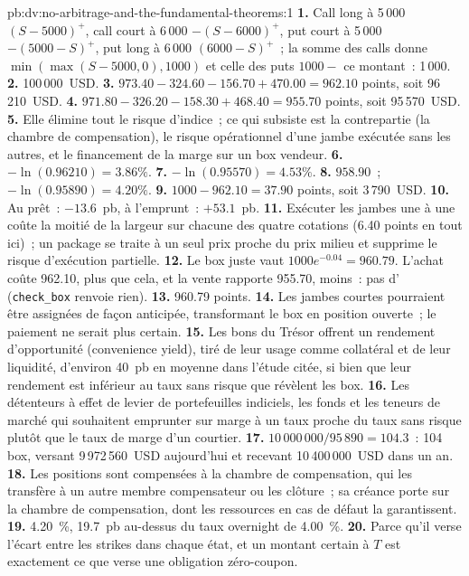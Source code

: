 \begin{solution}{pb:dv:no-arbitrage-and-the-fundamental-theorems:1}
\textbf{1.} Call long à 5\,000 $(S-5000)^+$, call court à 6\,000 $-(S-6000)^+$, put court
à 5\,000 $-(5000-S)^+$, put long à 6\,000 $(6000-S)^+$~; la somme des calls donne
$\min(\max(S-5000,0),1000)$ et celle des puts $1000-$ ce montant~: 1\,000.
\textbf{2.} 100\,000~USD.
\textbf{3.} $973.40-324.60-156.70+470.00=962.10$ points, soit 96\,210~USD.
\textbf{4.} $971.80-326.20-158.30+468.40=955.70$ points, soit 95\,570~USD.
\textbf{5.} Elle élimine tout le risque d'indice~; ce qui subsiste est la contrepartie (la
chambre de compensation), le risque opérationnel d'une jambe exécutée sans les autres, et
le financement de la marge sur un box vendeur.
\textbf{6.} $-\ln(0.96210)=3.86\%$.
\textbf{7.} $-\ln(0.95570)=4.53\%$.
\textbf{8.} $958.90$~; $-\ln(0.95890)=4.20\%$.
\textbf{9.} $1000-962.10=37.90$ points, soit 3\,790~USD.
\textbf{10.} Au prêt~: $-13.6$~pb, à l'emprunt~: $+53.1$~pb.
\textbf{11.} Exécuter les jambes une à une coûte la moitié de la largeur sur chacune des quatre cotations (6.40 points en
tout ici)~; un package se traite à un seul prix proche du prix milieu et supprime le
risque d'exécution partielle.
\textbf{12.} Le box juste vaut $1000e^{-0.04}=960.79$. L'achat coûte 962.10, plus que
cela, et la vente rapporte 955.70, moins~: pas d' (\texttt{check\_box} renvoie
rien).
\textbf{13.} 960.79 points.
\textbf{14.} Les jambes courtes pourraient être assignées de façon anticipée, transformant le box en
position ouverte~; le paiement ne serait plus certain.
\textbf{15.} Les bons du Trésor offrent un rendement d'opportunité (convenience yield), tiré de leur usage
comme collatéral et de leur liquidité, d'environ 40~pb en moyenne dans l'étude citée, si bien que leur rendement est inférieur au
taux sans risque que révèlent les box.
\textbf{16.} Les détenteurs à effet de levier de portefeuilles indiciels, les fonds et les teneurs de marché qui
souhaitent emprunter sur marge à un taux proche du taux sans risque plutôt
que le taux de marge d'un courtier.
\textbf{17.} $10\,000\,000/95\,890=104.3$~: 104 box, versant 9\,972\,560~USD aujourd'hui et
recevant 10\,400\,000~USD dans un an.
\textbf{18.} Les positions sont compensées à la chambre de compensation, qui les transfère à un autre
membre compensateur ou les clôture~; sa créance porte sur la chambre de compensation, dont les
ressources en cas de défaut la garantissent.
\textbf{19.} 4.20~\%, 19.7~pb au-dessus du taux overnight de 4.00~\%.
\textbf{20.} Parce qu'il verse l'écart entre les strikes dans chaque état, et un montant certain
à $T$ est exactement ce que verse une obligation zéro-coupon.
\end{solution}

